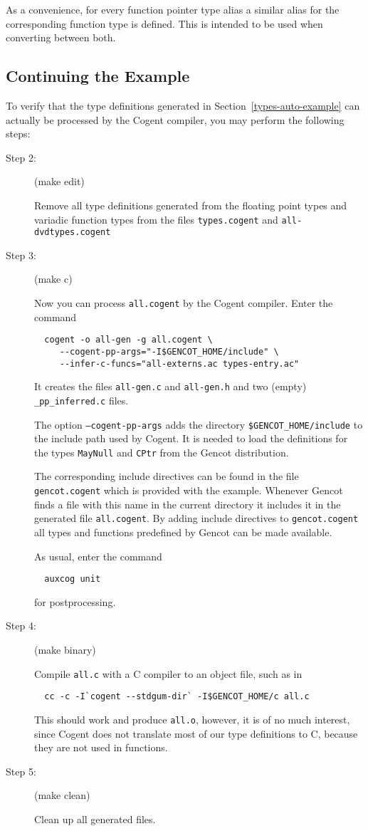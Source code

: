 \documentclass[a4paper]{report}
\newcommand{\code}[1]{\textnormal{\texttt{#1}}}
\begin{document}
As a convenience, for every function pointer type alias a similar alias for the corresponding function type is 
defined. This is intended to be used when converting between both.

\subsection{Continuing the Example}

To verify that the type definitions generated in Section~\ref{types-auto-example} can actually be processed by the 
Cogent compiler, you may perform the following steps:

\begin{description}
\item[Step 2:] (make edit)

Remove all type definitions generated from the floating point types and variadic function types 
from the files \code{types.cogent} and \code{all-dvdtypes.cogent}

\item[Step 3:] (make c)

Now you can process \code{all.cogent} by the Cogent compiler. Enter the command
\begin{verbatim}
  cogent -o all-gen -g all.cogent \
     --cogent-pp-args="-I$GENCOT_HOME/include" \
     --infer-c-funcs="all-externs.ac types-entry.ac"
\end{verbatim}
It creates the files \code{all-gen.c} and \code{all-gen.h} and two (empty) \code{\_pp\_inferred.c} files. 

The option \code{--cogent-pp-args} adds the directory \code{\$GENCOT\_HOME/include} to the include path
used by Cogent. It is needed to load the definitions for the types \code{MayNull} and \code{CPtr} from
the Gencot distribution. 

The corresponding include directives can be found in the file \code{gencot.cogent}
which is provided with the example. Whenever Gencot finds a file with this name in the current directory it 
includes it in the generated file \code{all.cogent}. By adding include directives to \code{gencot.cogent}
all types and functions predefined by Gencot can be made available.

As usual, enter the command
\begin{verbatim}
  auxcog unit
\end{verbatim}
for postprocessing.

\item[Step 4:] (make binary)

Compile \code{all.c} with a C compiler to an object file, such as in 
\begin{verbatim}
  cc -c -I`cogent --stdgum-dir` -I$GENCOT_HOME/c all.c
\end{verbatim}
This should work and produce \code{all.o}, however, it is of no much interest,
since Cogent does not translate most of our type definitions to C, because they are not used in functions.

\item[Step 5:] (make clean)

Clean up all generated files.
\end{description}
\end{document}
